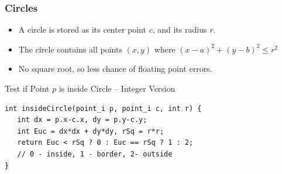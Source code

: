 \begin{frame}[fragile]
  \frametitle{Circles}
  \begin{itemize}
  \item A circle is stored as its center point $c$, and its radius $r$.\medskip

  \item The circle contains all points $(x,y)$ where $(x-a)^2+(y-b)^2 \leq r^2$\medskip

  \item No square root, so less chance of floating point errors.
  \end{itemize}\bigskip

  \begin{exampleblock}{Test if Point $p$ is inside Circle -- Integer Version}
    {\smaller
\begin{verbatim}
int insideCircle(point_i p, point_i c, int r) {
   int dx = p.x-c.x, dy = p.y-c.y;
   int Euc = dx*dx + dy*dy, rSq = r*r;
   return Euc < rSq ? 0 : Euc == rSq ? 1 : 2;
   // 0 - inside, 1 - border, 2- outside
}
\end{verbatim}
}
  \end{exampleblock}
\end{frame}


